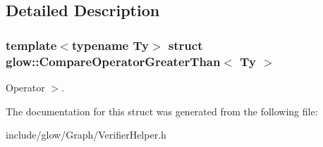 \subsection{Detailed Description}
\subsubsection*{template$<$typename Ty$>$\newline
struct glow\+::\+Compare\+Operator\+Greater\+Than$<$ Ty $>$}

Operator $>$. 

The documentation for this struct was generated from the following file\+:\begin{DoxyCompactItemize}
\item 
include/glow/\+Graph/Verifier\+Helper.\+h\end{DoxyCompactItemize}

